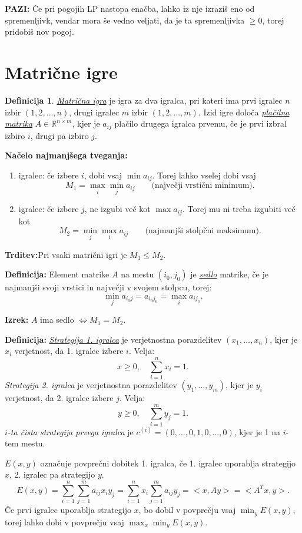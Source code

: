 \documentclass[8pt,a4paper]{amsart}
\theoremstyle{definition} %
\newtheorem{definicija}{Definicija}[section]
\theoremstyle{plain} %
\newcommand{\R}{\mathbb R}
\begin{document}
\textbf{PAZI:} Če pri pogojih LP nastopa enačba, lahko iz nje izraziš eno od spremenljivk, vendar mora še vedno veljati, da je ta spremenljivka $\geq 0$, torej pridobiš nov pogoj.

\section{Matrične igre}

\begin{definicija}
\emph{\underline{Matrična igra}} je igra za dva igralca, pri kateri ima prvi igralec $n$ izbir $(1,2,\ldots ,n)$, drugi igralec $m$ izbir $(1,2,\ldots ,m)$. Izid igre določa \emph{\underline{plačilna matrika}} $A\in \R^{n\times m}$, kjer je $a_{ij}$ plačilo drugega igralca prvemu, če je prvi izbral izbiro $i$, drugi pa izbiro $j$.
\end{definicija}

\textbf{Načelo najmanjšega tveganja:}
\begin{enumerate}[1.]
\item igralec: če izbere $i$, dobi vsaj $\min a_{ij}$. Torej lahko vselej dobi vsaj $$M_1 = \max_{i} \min_{j} a_{ij} \qquad \text{(največji vrstični minimum).}$$
\item igralec: če izbere $j$, ne izgubi več kot $\max a_{ij}$. Torej mu ni treba izgubiti več kot $$M_2 = \min_{j} \max_{i} a_{ij} \qquad \text{(najmanjši stolpčni maksimum).}$$
\end{enumerate}


\textbf{Trditev:}Pri vsaki matrični igri je $M_1 \leq M_2$.

\textbf{Definicija:}
 Element matrike $A$ na mestu $(i_0,j_0)$ je \emph{\underline{sedlo}} matrike, če je najmanjši svoji vrstici in največji v svojem stolpcu, torej:
 $$
 \min_{j} a_{i_0j} = a_{i_0j_0} = \max_{i} a_{ij_o}.
 $$

\textbf{Izrek:} $A$ ima sedlo $\Longleftrightarrow M_1 = M_2$.

\textbf{Definicija:} \underline{\emph{Strategija 1. igralca}} je verjetnostna porazdelitev $(x_1,\ldots ,x_n)$, kjer je $x_i$ verjetnost, da 1. igralec izbere $i$. Velja:
$$
x\geq 0, \quad \sum_{i=1}^{n}x_i=1.
$$
\emph{Strategija 2. igralca} je verjetnostna porazdelitev $(y_1,\ldots ,y_m)$, kjer je $y_i$ verjetnost, da 2. igralec izbere $j$. Velja:
$$
y\geq 0, \quad \sum_{i=1}^{m}y_j=1.
$$
\emph{$i$-ta čista strategija prvega igralca} je $c^{(i)}=(0,\ldots ,0,1,0,\ldots ,0)$, kjer je 1 na $i$-tem mestu.

$E(x,y)$ označuje povprečni dobitek 1. igralca, če 1. igralec uporablja strategijo $x$, 2. igralec pa strategijo $y$.
$$
E(x,y)=\sum_{i=1}^{n}\sum_{j=1}^{m}a_{ij}x_iy_j=\sum_{i=1}^{n}x_i\sum_{j=1}^{m}a_{ij}y_j= <x,Ay>=<A^Tx,y>.
$$
Če prvi igralec uporablja strategijo $x$, bo dobil v povprečju vsaj $\min_yE(x,y)$, torej lahko dobi v povprečju vsaj $\max_x\min_yE(x,y)$.
\end{document}
